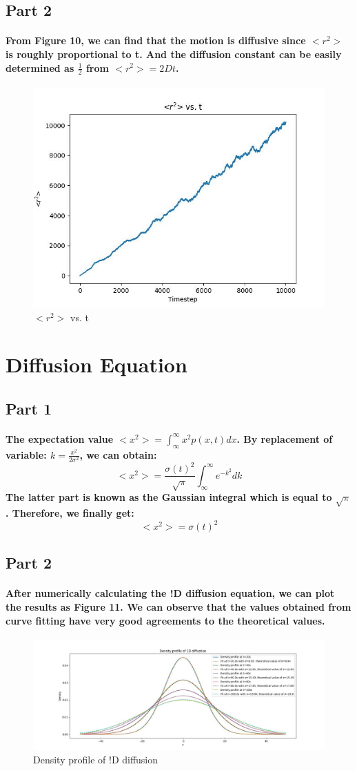 \documentclass{article}
\begin{document}
\subsection{Part 2}
\paragraph{
From Figure 10, we can find that the motion is diffusive since $<r^2>$ is roughly proportional to t. And the diffusion constant can be easily determined as $\frac{1}{2}$ from \(<r^2>=2Dt\).
}
\begin{figure}[htbp]
    \centering
    \includegraphics[width=0.5\linewidth]{Part2_2.jpeg}
    \caption{$<r^2>$ vs. t}
\end{figure}
\section{Diffusion Equation}
\subsection{Part 1}
\paragraph{
The expectation value \(<x^2>=\int_{\infty}^{\infty}x^2p(x,t)dx\). By replacement of variable: \(k=\frac{x^2}{2\sigma^2}\), we can obtain:
\[<x^2>=\frac{\sigma(t)^2}{\sqrt{\pi}}\int_{\infty}^{\infty}e^{-k^2}dk\]
The latter part is known as the Gaussian integral which is equal to $\sqrt{\pi}$. Therefore, we finally get:
\[<x^2>=\sigma(t)^2\]
}
\subsection{Part 2}
\paragraph{
After numerically calculating the !D diffusion equation, we can plot the results as Figure 11. We can observe that the values obtained from curve fitting have very good agreements to the theoretical values.
}
\begin{figure}[htbp]
    \centering
    \includegraphics[width=0.5\linewidth]{Part3_2.jpeg}
    \caption{Density profile of !D diffusion}
\end{figure}
\end{document}
